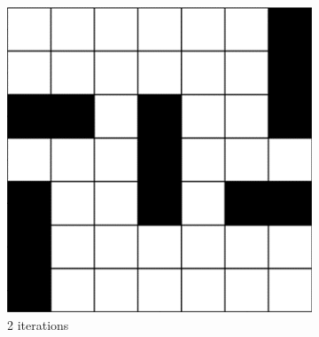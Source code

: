 \begin{figure}[ht]
	\centering
	\begin{subfigure}[t]{0.3\textwidth}
		\centering
		\includegraphics[width=\textwidth]{si_ls_2.png}
		\caption{2 iterations}
	\end{subfigure}
	\hfill
	\begin{subfigure}[t]{0.3\textwidth}
		\centering

\end{subfigure}
\end{figure}
